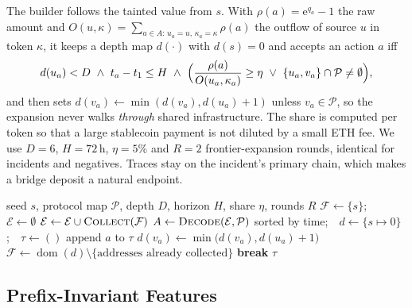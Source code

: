 \documentclass[runningheads]{llncs}
\newcommand{\1}{\mathbb{1}}
\begin{document}
The builder follows the tainted value from $s$.
With $\rho(a)=\mathrm{e}^{q_a}-1$ the raw amount and $O(u,\kappa)=\sum_{a\in A:\,u_a=u,\,\kappa_a=\kappa}\rho(a)$ the outflow of source $u$ in token $\kappa$, it keeps a depth map $d(\cdot)$ with $d(s)=0$ and accepts an action $a$ iff
\begin{equation}
d(u_a)<D\ \wedge\ t_a-t_1\le H\ \wedge\ \Bigl(\frac{\rho(a)}{O(u_a,\kappa_a)}\ge\eta\ \vee\ \{u_a,v_a\}\cap\mathcal{P}\neq\emptyset\Bigr),
\label{eq:builder}
\end{equation}
and then sets $d(v_a)\leftarrow\min(d(v_a),d(u_a)+1)$ unless $v_a\in\mathcal{P}$, so the expansion never walks \emph{through} shared infrastructure.
The share is computed per token so that a large stablecoin payment is not diluted by a small ETH fee.
We use $D=6$, $H=72$\,h, $\eta=5\%$ and $R=2$ frontier-expansion rounds, identical for incidents and negatives.
Traces stay on the incident's primary chain, which makes a bridge deposit a natural endpoint.

\begin{algorithm}[t]
\caption{Bounded value-flow trajectory builder}
\label{alg:builder}
\begin{algorithmic}[1]
\Require seed $s$, protocol map $\mathcal{P}$, depth $D$, horizon $H$, share $\eta$, rounds $R$
\State $\mathcal{F}\gets\{s\}$;\ \ $\mathcal{E}\gets\emptyset$ 
  \State $\mathcal{E}\gets\mathcal{E}\cup\textsc{Collect}(\mathcal{F})$ 
  \State $A\gets\textsc{Decode}(\mathcal{E},\mathcal{P})$ sorted by time;\ \ $d\gets\{s\mapsto0\}$;\ \ $\tau\gets()$
      \State append $a$ to $\tau$
       $d(v_a)\gets\min\bigl(d(v_a),d(u_a)+1\bigr)$ \EndIf
    \EndIf
  \EndFor
  \State $\mathcal{F}\gets\operatorname{dom}(d)\setminus\{\text{addresses already collected}\}$
   \textbf{break} \EndIf
\EndFor
\State \Return $\tau$
\end{algorithmic}
\end{algorithm}

\subsection{Prefix-Invariant Features}
\label{sec:features}
\end{document}
